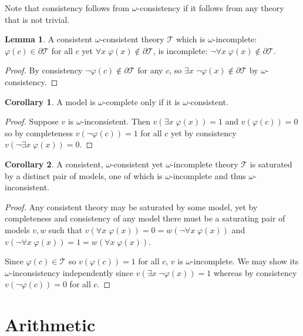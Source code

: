 \documentclass{amsbook}
\newcommand{\univ}[1]{\mathord\forall#1\;}
\newcommand{\exis}[1]{\mathord\exists#1\;}
\theoremstyle{definition}
\newtheorem{lmm}{Lemma}[section]
\newtheorem{crl}{Corollary}[section]
\begin{document}
Note that consistency follows from $\omega$-consistency if it follows from any theory that is not trivial.

\begin{lmm}
    A consistent $\omega$-consistent theory $\mathcal T$ which is $\omega$-incomplete: $\varphi(c) \in \partial\mathcal T$ for all $c$ yet $\univ x \varphi(x) \notin \partial\mathcal T$, is incomplete: $\neg\univ x \varphi(x) \notin \partial\mathcal T$.

    \begin{proof}
        By consistency $\neg\varphi(c) \notin \partial\mathcal T$ for any $c$, so $\exis x \neg\varphi(x) \notin \partial\mathcal T$ by $\omega$-consistency.
    \end{proof}
\end{lmm}

\begin{crl}
    A model is $\omega$-complete only if it is $\omega$-consistent.
    \begin{proof}
        Suppose $v$ is $\omega$-inconsistent. Then $v(\exis x \varphi(x)) = 1$ and $v(\varphi(c)) = 0$ so by completeness $v(\neg\varphi(c)) = 1$ for all $c$ yet by consistency $v(\neg\exis x \varphi(x)) = 0$.
    \end{proof}
\end{crl}

\begin{crl}
    A consistent, $\omega$-consistent yet $\omega$-incomplete theory $\mathcal T$ is saturated by a distinct pair of models, one of which is $\omega$-incomplete and thus $\omega$-inconsistent.
    \begin{proof}
        Any consistent theory may be saturated by some model, yet by completeness and consistency of any model there must be a saturating pair of models $v, w$ such that $v(\univ x \varphi(x)) = 0 = w(\neg\univ x \varphi(x))$ and $v(\neg\univ x \varphi(x)) = 1 = w(\univ x \varphi(x))$.

        Since $\varphi(c) \in \mathcal T$ so $v(\varphi(c)) = 1$ for all $c$, $v$ is $\omega$-incomplete. We may show its $\omega$-inconsistency independently since $v(\exis x \neg\varphi(x)) = 1$ whereas by consistency $v(\neg\varphi(c)) = 0$ for all $c$.
    \end{proof}
\end{crl}

\appendix

\chapter{Arithmetic}
\end{document}

